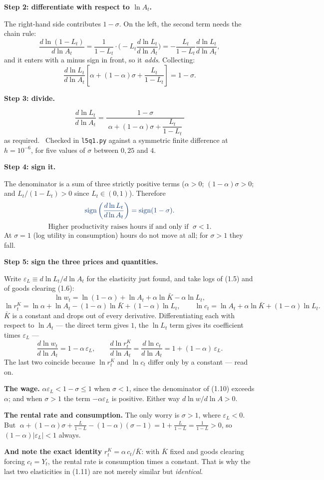 \documentclass[11pt, a4paper]{article}
\newcommand{\passo}[1]{\medskip\noindent\textbf{#1}\par\nobreak}
\newcommand{\resp}[1]{%
  \ifmmode {\color{darkblue}#1}\else\textcolor{darkblue}{\textbf{#1}}\fi}
\newcommand{\Kb}{\bar K}
\begin{document}
\passo{Step 2: differentiate with respect to $\ln A_t$.} The right-hand side contributes
$1-\sigma$. On the left, the second term needs the chain rule:
\[
\frac{d\ln(1-L_t)}{d\ln A_t}
=\frac{1}{1-L_t}\cdot\Big(-L_t\frac{d\ln L_t}{d\ln A_t}\Big)
=-\frac{L_t}{1-L_t}\frac{d\ln L_t}{d\ln A_t},
\]
and it enters with a minus sign in front, so it \emph{adds}. Collecting:
\[
\frac{d\ln L_t}{d\ln A_t}\left[\alpha+(1-\alpha)\sigma+\frac{L_t}{1-L_t}\right]=1-\sigma .
\]

\passo{Step 3: divide.}
\[
\boxed{\;
\frac{d\ln L_t}{d\ln A_t}
=\frac{1-\sigma}{\;\alpha+(1-\alpha)\sigma+\dfrac{L_t}{1-L_t}\;}\;}
\tag{1.10}
\]
as required. \checkmark\ Checked in \texttt{l5q1.py} against a symmetric finite difference
at $h=10^{-6}$, for five values of $\sigma$ between $0{,}25$ and $4$.

\passo{Step 4: sign it.} The denominator is a sum of three strictly positive terms
($\alpha>0$; $(1-\alpha)\sigma>0$; and $L_t/(1-L_t)>0$ since $L_t\in(0,1)$). Therefore
\[
\resp{\operatorname{sign}\left(\frac{d\ln L_t}{d\ln A_t}\right)
=\operatorname{sign}(1-\sigma) .}
\]
\[
\boxed{\;\text{Higher productivity raises hours if and only if }\;\sigma<1 .\;}
\]
At $\sigma=1$ (log utility in consumption) hours do not move at all; for $\sigma>1$ they
fall.

\passo{Step 5: sign the three prices and quantities.} Write
$\varepsilon_L\equiv d\ln L_t/d\ln A_t$ for the elasticity just found, and take logs of
(1.5) and of goods clearing (1.6):
\[
\ln w_t=\ln(1-\alpha)+\ln A_t+\alpha\ln\Kb-\alpha\ln L_t ,
\]
\[
\ln r^K_t=\ln\alpha+\ln A_t-(1-\alpha)\ln\Kb+(1-\alpha)\ln L_t ,
\qquad
\ln c_t=\ln A_t+\alpha\ln\Kb+(1-\alpha)\ln L_t .
\]
$\Kb$ is a constant and drops out of every derivative. Differentiating each with respect to
$\ln A_t$ --- the direct term gives $1$, the $\ln L_t$ term gives its coefficient times
$\varepsilon_L$ ---
\[
\frac{d\ln w_t}{d\ln A_t}=1-\alpha\,\varepsilon_L,
\qquad
\frac{d\ln r^K_t}{d\ln A_t}=\frac{d\ln c_t}{d\ln A_t}=1+(1-\alpha)\,\varepsilon_L .
\tag{1.11}
\]
The last two coincide because $\ln r^K_t$ and $\ln c_t$ differ only by a constant --- read
on.

\begin{tcolorbox}[planbox, title={All three rise, for \emph{every} $\sigma$ --- and here is why}]
\small
\textbf{The wage.} $\alpha\varepsilon_L<1-\sigma\le 1$ when $\sigma<1$, since the
denominator of (1.10) exceeds $\alpha$; and when $\sigma>1$ the term $-\alpha\varepsilon_L$
is positive. Either way $d\ln w/d\ln A>0$. \checkmark

\smallskip
\textbf{The rental rate and consumption.} The only worry is $\sigma>1$, where
$\varepsilon_L<0$. But
$\;\alpha+(1-\alpha)\sigma+\frac{L}{1-L}-(1-\alpha)(\sigma-1)=1+\frac{L}{1-L}=\frac{1}{1-L}>0$,
so $(1-\alpha)|\varepsilon_L|<1$ always. \checkmark

\smallskip
\textbf{And note the exact identity} $r^K_t=\alpha\,c_t/\Kb$: with $\Kb$ fixed and goods
clearing forcing $c_t=Y_t$, the rental rate is consumption times a constant. That is why
the last two elasticities in (1.11) are not merely similar but \emph{identical}. \checkmark
\end{tcolorbox}
\end{document}
